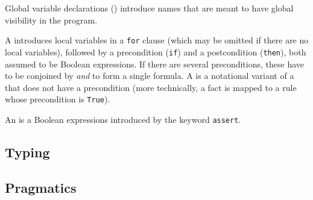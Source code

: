 Global variable declarations () introduce names
that are meant to have global visibility in the program.

A  introduces local variables in a
\texttt{for} clause (which may be omitted if there are no local variables),
followed by a precondition (\texttt{if}) and a postcondition (\texttt{then}),
both assumed to be Boolean expressions. If there are several preconditions,
these have to be conjoined by \emph{and} to form a single formula. 
A  is a notational variant of a  
that does not have a precondition (more technically, a fact is mapped to a
rule whose precondition is \texttt{True}).

An  is a Boolean expressions introduced by the keyword \texttt{assert}.


\subsection{Typing}\label{sec:typing}



\subsection{Pragmatics}\label{sec:pragmatics}



